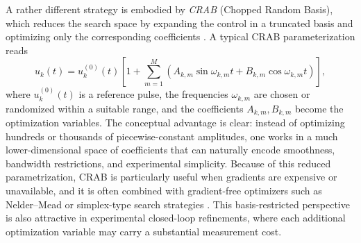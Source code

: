 A rather different strategy is embodied by \emph{CRAB} (Chopped Random Basis), which reduces the search space by expanding the control in a truncated basis and optimizing only the corresponding coefficients \cite{Caneva2011}. A typical CRAB parameterization reads
\begin{equation}
u_k(t)
=
u_k^{(0)}(t)
\left[
1+
\sum_{m=1}^{M}
\left(
A_{k,m}\sin \omega_{k,m} t
+
B_{k,m}\cos \omega_{k,m} t
\right)
\right],
\label{eq:crab_ansatz}
\end{equation}
where $u_k^{(0)}(t)$ is a reference pulse, the frequencies $\omega_{k,m}$ are chosen or randomized within a suitable range, and the coefficients $A_{k,m},B_{k,m}$ become the optimization variables. The conceptual advantage is clear: instead of optimizing hundreds or thousands of piecewise-constant amplitudes, one works in a much lower-dimensional space of coefficients that can naturally encode smoothness, bandwidth restrictions, and experimental simplicity. Because of this reduced parametrization, CRAB is particularly useful when gradients are expensive or unavailable, and it is often combined with gradient-free optimizers such as Nelder--Mead or simplex-type search strategies \cite{Caneva2011}. This basis-restricted perspective is also attractive in experimental closed-loop refinements, where each additional optimization variable may carry a substantial measurement cost.


